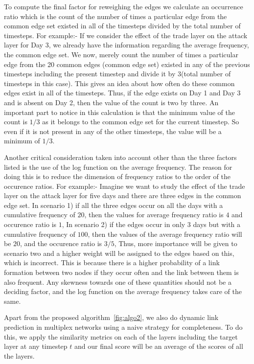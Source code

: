 To compute the final factor for reweighing the edges we calculate an
occurrence ratio which is the count of the number of times a particular edge
from the common edge set existed in all of the timesteps divided by the total
number of timesteps. For example:- If we consider the effect of the trade
layer on the attack layer for Day 3, we already have the information regarding
the average frequency, the common edge set. We now, merely count the number of
times a particular edge from the 20 common edges (common edge set) existed in
any of the previous timesteps including the present timestep and divide it by
3(total number of timesteps in this case). This gives an idea about how often
do these common edges exist in all of the timesteps. Thus, if the edge exists
on Day 1 and Day 3 and is absent on Day 2, then the value of the count is two
by three. An important part to notice in this calculation is that the minimum
value of the count is $1/3$ as it belongs to the common edge set for the current
timestep. So even if it is not present in any of the other timesteps, the
value will be a minimum of $1/3$.

Another critical consideration taken into account other than the three factors
listed is the use of the log function on the average frequency. The reason for
doing this is to reduce the dimension of frequency ratios to the order of the
occurence ratios.
For example:- Imagine we want to study the effect of the trade layer on the
attack layer for five days and there are three edges in the common edge set.
In scenario 1) if all the three edges occur on all the days with a cumulative
frequency of $20$, then the values for average frequency ratio is $4$ and
occurence ratio is $1$, In scenario 2) if the edges occur in only $3$ days but
with a cumulative frequency of $100$, then the values of the average frequency
ratio will be $20$, and the occurence ratio is $3/5$, Thus, more importance
will be given to scenario two and a higher weight will be assigned to the
edges based on this, which is incorrect. This is because there is a higher
probability of a link formation between two nodes if they occur often and the
link between them is also frequent. Any skewness towards one of these
quantities should not be a deciding factor, and the log function on the
average frequency takes care of the same.

Apart from the proposed algorithm~\ref{fig:algo2}, we also do dynamic link
prediction in multiplex networks using  a naive strategy for completeness. To
do this,  we apply the similarity metrics on each of the layers including the
target layer at any timestep $t$ and our final  score will be an average of
the scores of all the layers.



